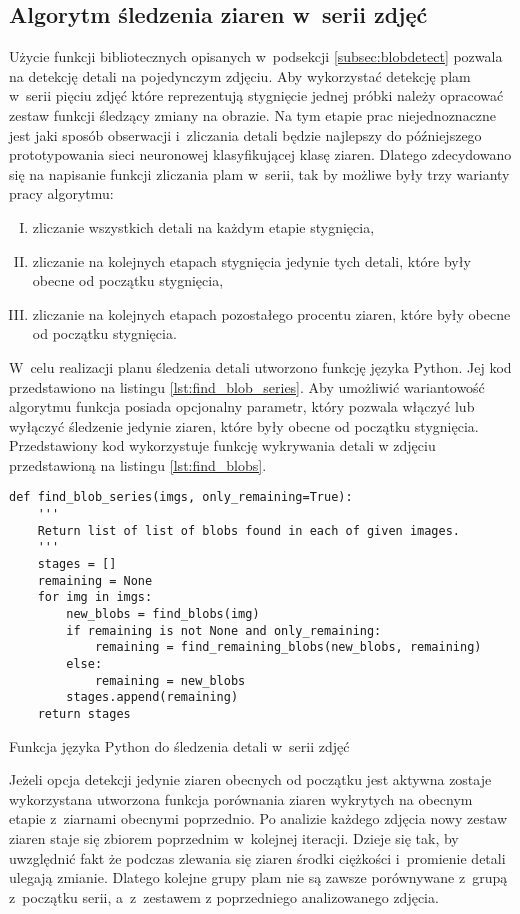 \subsection{Algorytm śledzenia ziaren w~serii zdjęć}
\label{subsec:blobtracking}
Użycie funkcji bibliotecznych opisanych w~podsekcji \ref{subsec:blobdetect}
pozwala na detekcję detali na pojedynczym zdjęciu.
Aby wykorzystać detekcję plam w~serii pięciu zdjęć które reprezentują
stygnięcie jednej próbki należy opracować zestaw funkcji śledzący zmiany 
na obrazie.
Na tym etapie prac niejednoznaczne jest jaki sposób obserwacji i~zliczania
detali będzie najlepszy do późniejszego prototypowania sieci neuronowej
klasyfikującej klasę ziaren.
Dlatego zdecydowano się na napisanie funkcji zliczania plam w~serii, tak by
możliwe były trzy warianty pracy algorytmu:
\begin{enumerate}[I.]
	\item \label{it:allblob}
	      zliczanie wszystkich detali na każdym etapie stygnięcia,
	\item \label{it:remainingblob}
	      zliczanie na kolejnych etapach stygnięcia jedynie tych detali,
	      które były obecne od początku stygnięcia,
	\item \label{it:percentblob}
	      zliczanie na kolejnych etapach pozostałego procentu ziaren, które
	      były obecne od początku stygnięcia.
\end{enumerate}

W~celu realizacji planu śledzenia detali utworzono funkcję języka Python.
Jej kod przedstawiono na listingu \ref{lst:find_blob_series}.
Aby umożliwić wariantowość algorytmu funkcja posiada opcjonalny parametr,
który pozwala włączyć lub wyłączyć śledzenie jedynie ziaren, które
były obecne od początku stygnięcia.
Przedstawiony kod wykorzystuje funkcję wykrywania detali w zdjęciu
przedstawioną na listingu \ref{lst:find_blobs}.
\begin{listing}[htbp]
\begin{verbatim}
def find_blob_series(imgs, only_remaining=True):
    '''
    Return list of list of blobs found in each of given images.
    '''
    stages = []
    remaining = None
    for img in imgs:
        new_blobs = find_blobs(img)
        if remaining is not None and only_remaining:
            remaining = find_remaining_blobs(new_blobs, remaining)
        else:
            remaining = new_blobs
        stages.append(remaining)
    return stages
\end{verbatim}
\caption{Funkcja języka Python do śledzenia detali w~serii zdjęć}
\label{lst:find_blob_series}
\end{listing}
Jeżeli opcja detekcji jedynie ziaren obecnych od początku jest aktywna
zostaje wykorzystana utworzona funkcja porównania ziaren wykrytych
na obecnym etapie z~ziarnami obecnymi poprzednio.
Po analizie każdego zdjęcia nowy zestaw ziaren staje się zbiorem poprzednim
w~kolejnej iteracji.
Dzieje się tak, by uwzględnić fakt że podczas zlewania się ziaren środki
ciężkości i~promienie detali ulegają zmianie.
Dlatego kolejne grupy plam nie są zawsze porównywane z~grupą z~początku
serii, a~z~zestawem z poprzedniego analizowanego zdjęcia.

